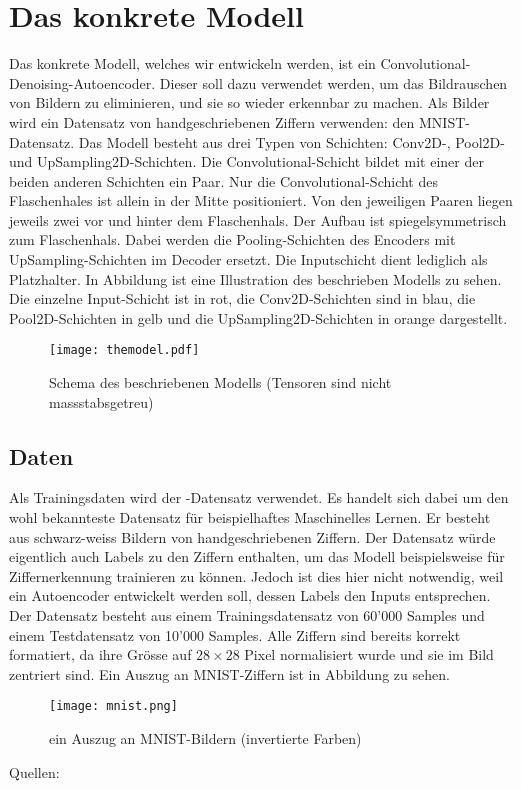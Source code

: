 \section{Das konkrete Modell}
Das konkrete Modell, welches wir entwickeln werden, ist ein
Convolutional-Denoising-Autoencoder. Dieser soll dazu verwendet werden, um das
Bildrauschen von Bildern zu eliminieren, und sie so wieder erkennbar zu machen.
Als Bilder wird ein Datensatz von handgeschriebenen Ziffern verwenden:
den MNIST-Datensatz.
\para{}
Das Modell besteht aus drei Typen von Schichten: Conv2D-,
Pool2D- und UpSampling2D-Schichten. Die Convolutional-Schicht bildet mit einer
der beiden anderen Schichten ein Paar. Nur die Convolutional-Schicht
des Flaschenhales ist allein in der Mitte positioniert. Von den jeweiligen
Paaren liegen jeweils zwei vor und hinter dem Flaschenhals.
Der Aufbau ist spiegelsymmetrisch zum Flaschenhals. Dabei werden die
Pooling-Schichten des Encoders mit UpSampling-Schichten im Decoder ersetzt. Die
Inputschicht dient lediglich als Platzhalter.
\para{}
In Abbildung  ist eine Illustration des beschrieben
Modells zu sehen. Die einzelne Input-Schicht ist in rot, die Conv2D-Schichten sind in blau, die
Pool2D-Schichten in gelb und die UpSampling2D-Schichten in orange dargestellt.

\begin{figure}[h!]
  \centering
  \texttt{[image: themodel.pdf]}
  \caption{Schema des beschriebenen Modells (Tensoren sind nicht massstabsgetreu)}
  \label{fig:the_model}
\end{figure}

\subsection{Daten}
Als Trainingsdaten wird der -Datensatz verwendet. Es handelt sich
dabei um den wohl bekannteste Datensatz für beispielhaftes Maschinelles Lernen.
Er besteht aus schwarz-weiss Bildern von handgeschriebenen Ziffern.
Der Datensatz würde eigentlich auch Labels zu den Ziffern enthalten, um das Modell beispielsweise
für Ziffernerkennung trainieren zu können. Jedoch ist dies hier nicht notwendig,
weil ein Autoencoder entwickelt werden soll, dessen Labels den Inputs entsprechen.
\para{}
Der Datensatz besteht aus einem Trainingsdatensatz von 60'000 Samples und einem Testdatensatz
von 10'000 Samples. Alle Ziffern sind bereits korrekt formatiert, da ihre Grösse
auf $28 \times 28$ Pixel normalisiert wurde und sie im Bild zentriert sind. Ein
Auszug an MNIST-Ziffern ist in Abbildung  zu sehen.
\para{}
\begin{figure}[h!]
  \centering
  \texttt{[image: mnist.png]}
  \caption{ein Auszug an MNIST-Bildern (invertierte Farben) \cite{res:mnist_images}}
  \label{fig:minst}
\end{figure}
\para{}
Quellen: \cite{net:mnist}

